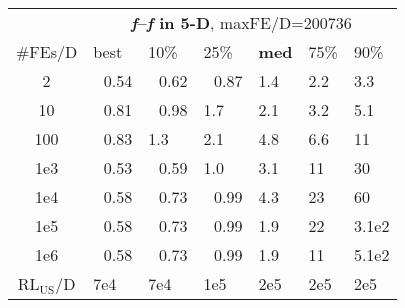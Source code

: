 \begin{tabular}{c|llllll}
 & \multicolumn{6}{|c}{\textbf{\textit{f}\raisebox{-0.35ex}{1}--\textit{f}\raisebox{-0.35ex}{24} in 5-D}, maxFE/D=200736}\\
\#FEs/D & best & 10\% & 25\% & \textbf{med} & 75\% & 90\%\\
2 & ~\,0.54 & ~\,0.62 & ~\,0.87 & \hspace*{1ex}1.4 & \hspace*{1ex}2.2 & \hspace*{1ex}3.3\\
10 & ~\,0.81 & ~\,0.98 & \hspace*{1ex}1.7 & \hspace*{1ex}2.1 & \hspace*{1ex}3.2 & \hspace*{1ex}5.1\\
100 & ~\,0.83 & \hspace*{1ex}1.3 & \hspace*{1ex}2.1 & \hspace*{1ex}4.8 & \hspace*{1ex}6.6 & 11\\
1e3 & ~\,0.53 & ~\,0.59 & \hspace*{1ex}1.0 & \hspace*{1ex}3.1 & 11 & 30\\
1e4 & ~\,0.58 & ~\,0.73 & ~\,0.99 & \hspace*{1ex}4.3 & 23 & 60\\
1e5 & ~\,0.58 & ~\,0.73 & ~\,0.99 & \hspace*{1ex}1.9 & 22 & 3.1e2\\
1e6 & ~\,0.58 & ~\,0.73 & ~\,0.99 & \hspace*{1ex}1.9 & 11 & 5.1e2\\
$\text{RL}_{\text{US}}$/D & 7e4 & 7e4 & 1e5 & 2e5 & 2e5 & 2e5
\end{tabular}
